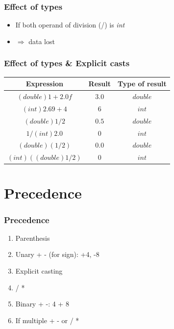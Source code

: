 \documentclass{../c-lecture}
\begin{document}
\begin{frame}
  \frametitle{Effect of types}
  \begin{itemize}
    \item
      If both operand of division (/) is \textit{\color{Orange} int}
    \item $\Rightarrow$ data lost
  \end{itemize}
\end{frame}

\begin{frame}
  \frametitle{Effect of types \& Explicit casts}
  \begin{table}
  \begin{tabular}{ccc}
    \toprule

    Expression &
    Result &
    Type of result \\

    \midrule

    $(double) 1 + 2.0f$ &
    $3.0$ &
    $double$ \\

    \midrule

    $(int) 2.69 + 4$ &
    $6$ &
    $int$ \\

    \midrule

    $(double) 1 / 2$ &
    $0.5$ &
    $double$ \\

    \midrule

    $1 / (int) 2.0$ &
    $0$ &
    $int$ \\

    \midrule

    $(double) (1 / 2)$ &
    $0.0$ &
    $double$ \\

    \midrule

    $(int)((double) 1 / 2)$ &
    $0$ &
    $int$ \\

    \bottomrule
  \end{tabular}
  \end{table}
\end{frame}

\section{Precedence}

\begin{frame}
  \frametitle{Precedence}
  \begin{enumerate}
    \item Parenthesis
    \item Unary + - (for sign): +4, -8
    \item Explicit casting
    \item / * %
    \item Binary + -: 4 + 8
    \item If multiple + - or / * %
  \end{enumerate}
\end{frame}
\end{document}
